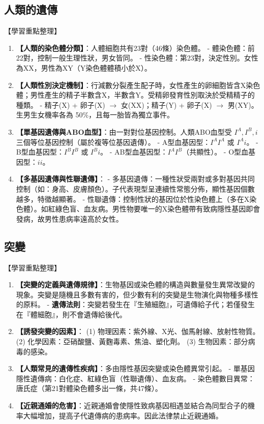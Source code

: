 \documentclass[11pt,a4paper]{article}
\begin{document}
\subsection{人類的遺傳}
\begin{learningpoints}{【學習重點整理】}
\begin{enumerate}[label=\arabic*.]
  \item \textbf{【人類的染色體分類】}：人體細胞共有23對（46條）染色體。
  - 體染色體：前22對，控制一般生理性狀，男女皆同。
  - 性染色體：第23對，決定性別。女性為XX，男性為XY（Y染色體體積小於X）。
  \item \textbf{【人類性別決定機制】}：行減數分裂產生配子時，女性產生的卵細胞皆含X染色體；男性產生的精子半數含X，半數含Y。受精卵發育性別取決於受精精子的種類。
  - 精子(X) + 卵子(X) $\rightarrow$ 女(XX)；精子(Y) + 卵子(X) $\rightarrow$ 男(XY)。生男生女機率各為 50\%，且每一胎皆為獨立事件。
  \item \textbf{【單基因遺傳與ABO血型】}：由一對對位基因控制。人類ABO血型受 $I^A, I^B, i$ 三個等位基因控制（屬於複等位基因遺傳）。
  - A型血基因型：$I^A I^A$ 或 $I^A i$。
  - B型血基因型：$I^B I^B$ 或 $I^B i$。
  - AB型血基因型：$I^A I^B$（共顯性）。
  - O型血基因型：$ii$。
  \item \textbf{【多基因遺傳與性聯遺傳】}：
  - 多基因遺傳：一種性狀受兩對或多對基因共同控制（如：身高、皮膚顏色）。子代表現型呈連續性常態分佈，顯性基因個數越多，特徵越顯著。
  - 性聯遺傳：控制性狀的基因位於性染色體上（多在X染色體）。如紅綠色盲、血友病。男性物要唯一的X染色體帶有致病隱性基因即會發病，故男性患病率遠高於女性。
\end{enumerate}
\end{learningpoints}

\subsection{突變}
\begin{learningpoints}{【學習重點整理】}
\begin{enumerate}[label=\arabic*.]
  \item \textbf{【突變的定義與遺傳規律】}：生物基因或染色體的構造與數量發生異常改變的現象。突變是隨機且多數有害的，但少數有利的突變是生物演化與物種多樣性的原料。
  - \textbf{遺傳法則}：突變若發生在『生殖細胞』，可遺傳給子代；若僅發生在『體細胞』，則不會遺傳給後代。
  \item \textbf{【誘發突變的因素】}：
  (1) 物理因素：紫外線、X光、伽馬射線、放射性物質。
  (2) 化學因素：亞硝酸鹽、黃麴毒素、焦油、塑化劑。
  (3) 生物因素：部分病毒的感染。
  \item \textbf{【人類常見的遺傳性疾病】}：多由隱性基因突變或染色體異常引起。
  - 單基因隱性遺傳病：白化症、紅綠色盲（性聯遺傳）、血友病。
  - 染色體數目異常：唐氏症（第21對體染色體多出一條，共47條）。
  \item \textbf{【近親通婚的危害】}：近親通婚會使隱性致病基因相遇並結合為同型合子的機率大幅增加，提高子代遺傳病的患病率。因此法律禁止近親通婚。
\end{enumerate}
\end{learningpoints}
\end{document}
